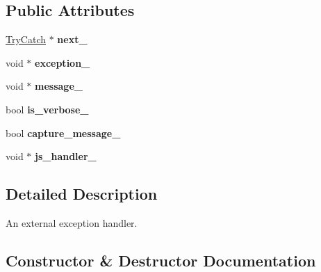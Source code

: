 \subsection*{Public Attributes}
\begin{DoxyCompactItemize}
\item 
\hypertarget{classv8_1_1_try_catch_ae1e039966ea18612bb2ecfdd2602ea84}{}\hyperlink{classv8_1_1_try_catch}{Try\+Catch} $\ast$ {\bfseries next\+\_\+}\label{classv8_1_1_try_catch_ae1e039966ea18612bb2ecfdd2602ea84}

\item 
\hypertarget{classv8_1_1_try_catch_a4ae6a166af0336716516addc1f64fe1f}{}void $\ast$ {\bfseries exception\+\_\+}\label{classv8_1_1_try_catch_a4ae6a166af0336716516addc1f64fe1f}

\item 
\hypertarget{classv8_1_1_try_catch_a9317fc63672d0c1497cc88277b7ebd44}{}void $\ast$ {\bfseries message\+\_\+}\label{classv8_1_1_try_catch_a9317fc63672d0c1497cc88277b7ebd44}

\item 
\hypertarget{classv8_1_1_try_catch_a3c2798d8716a14df4550bfadefdcf6a7}{}bool {\bfseries is\+\_\+verbose\+\_\+}\label{classv8_1_1_try_catch_a3c2798d8716a14df4550bfadefdcf6a7}

\item 
\hypertarget{classv8_1_1_try_catch_ad1f5b0368678fa2bd0d73ac17acf976e}{}bool {\bfseries capture\+\_\+message\+\_\+}\label{classv8_1_1_try_catch_ad1f5b0368678fa2bd0d73ac17acf976e}

\item 
\hypertarget{classv8_1_1_try_catch_aa13245997ead01d269399df308697543}{}void $\ast$ {\bfseries js\+\_\+handler\+\_\+}\label{classv8_1_1_try_catch_aa13245997ead01d269399df308697543}

\end{DoxyCompactItemize}


\subsection{Detailed Description}
An external exception handler. 

\subsection{Constructor \& Destructor Documentation}
\hypertarget{classv8_1_1_try_catch_adc9b1b11e73b0325df727914c348053d}{}
